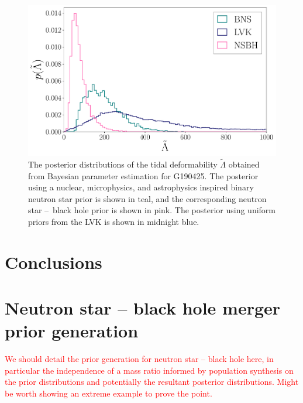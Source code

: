 \documentclass[twocolumn]{aastex631}
\newcommand{\red}[1]{\textcolor{red}{#1}}
\begin{document}
	\begin{figure}
		\centering
		\includegraphics[width=1.\linewidth]{Fig_3_GW190425_lambda_tilde_posteriors.pdf}
		\caption{The posterior distributions of the tidal deformability $\tilde{\Lambda}$ obtained from Bayesian parameter estimation for G190425. The posterior using a nuclear, microphysics, and astrophysics inspired binary neutron star prior is shown in teal, and the corresponding neutron star --~black hole prior is shown in pink. 
			The posterior using uniform priors from the LVK is shown in midnight blue. }
		\label{fig:GW190425_tides}
	\end{figure}
	
	\section{Conclusions}
	
	\appendix
	
	\section{Neutron star -- black hole merger prior generation}\label{sec:NSBH generation}
	
	\red{We should detail the prior generation for neutron star -- black hole here, in particular the independence of a mass ratio informed by population synthesis on the prior distributions and potentially the resultant posterior distributions. Might be worth showing an extreme example to prove the point.}
	
\end{document}

